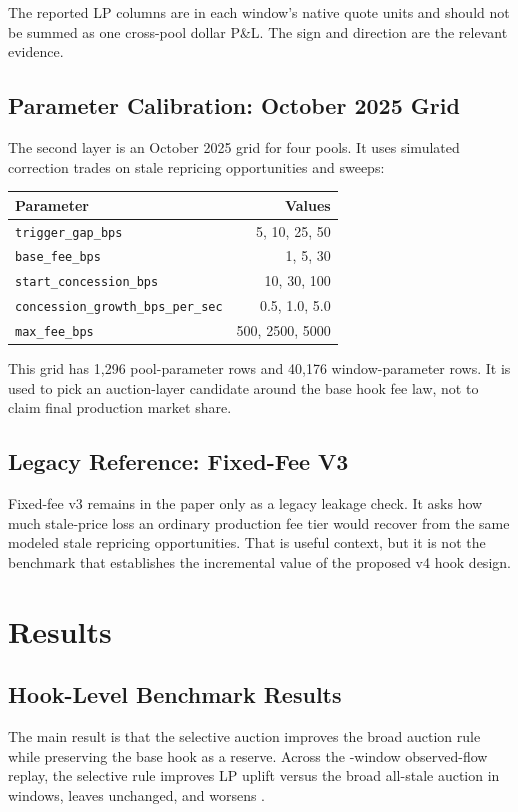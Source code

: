 \documentclass[11pt]{article}
\begin{document}
The reported LP columns are in each window's native quote units and should not be summed as one cross-pool dollar P\&L. The sign and direction are the relevant evidence.

\subsection{Parameter Calibration: October 2025 Grid}
The second layer is an October 2025 grid for four pools. It uses simulated correction trades on stale repricing opportunities and sweeps:
\begin{center}
\begin{tabular}{lr}
\toprule
Parameter & Values \\
\midrule
\texttt{trigger\_gap\_bps} & 5, 10, 25, 50 \\
\texttt{base\_fee\_bps} & 1, 5, 30 \\
\texttt{start\_concession\_bps} & 10, 30, 100 \\
\texttt{concession\_growth\_bps\_per\_sec} & 0.5, 1.0, 5.0 \\
\texttt{max\_fee\_bps} & 500, 2500, 5000 \\
\bottomrule
\end{tabular}
\end{center}
This grid has 1,296 pool-parameter rows and 40,176 window-parameter rows. It is used to pick an auction-layer candidate around the base hook fee law, not to claim final production market share.

\subsection{Legacy Reference: Fixed-Fee V3}
Fixed-fee v3 remains in the paper only as a legacy leakage check. It asks how much stale-price loss an ordinary production fee tier would recover from the same modeled stale repricing opportunities. That is useful context, but it is not the benchmark that establishes the incremental value of the proposed v4 hook design.

\section{Results}
\subsection{Hook-Level Benchmark Results}
The main result is that the selective auction improves the broad auction rule while preserving the base hook as a reserve. Across the \EvidenceAblationWindows{}-window observed-flow replay, the selective rule improves LP uplift versus the broad all-stale auction in \EvidenceAblationImproved{} windows, leaves \EvidenceAblationUnchanged{} unchanged, and worsens \EvidenceAblationWorsened{}.
\end{document}
